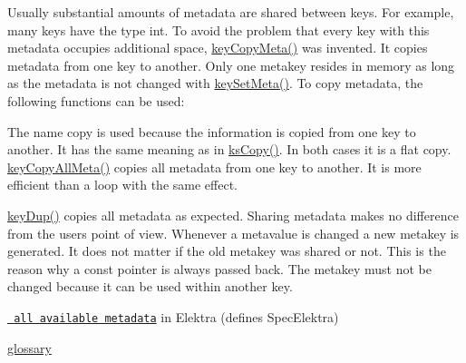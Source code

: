 Usually substantial amounts of metadata are shared between keys. For example, many keys have the type {\ttfamily int}. To avoid the problem that every key with this metadata occupies additional space, {\ttfamily \mbox{\hyperlink{group__keymeta_ga9a22b992478e613c8788bd460b4a1f0c}{key\+Copy\+Meta()}}} was invented. It copies metadata from one key to another. Only one metakey resides in memory as long as the metadata is not changed with {\ttfamily \mbox{\hyperlink{group__keymeta_gae1f15546b234ffb6007d8a31178652b9}{key\+Set\+Meta()}}}. To copy metadata, the following functions can be used\+:


\begin{DoxyCode}{0}
\end{DoxyCode}


The name {\ttfamily copy} is used because the information is copied from one key to another. It has the same meaning as in {\ttfamily \mbox{\hyperlink{group__keyset_gaba1f1dbea191f4d7e7eb3e4296ae7d5e}{ks\+Copy()}}}. In both cases it is a flat copy. {\ttfamily \mbox{\hyperlink{group__keymeta_ga8e63720a65610a29597494d0671f9401}{key\+Copy\+All\+Meta()}}} copies all metadata from one key to another. It is more efficient than a loop with the same effect.

{\ttfamily \mbox{\hyperlink{group__key_gae6ec6a60cc4b8c1463fa08623d056ce3}{key\+Dup()}}} copies all metadata as expected. Sharing metadata makes no difference from the user\textquotesingle{}s point of view. Whenever a metavalue is changed a new metakey is generated. It does not matter if the old metakey was shared or not. This is the reason why a const pointer is always passed back. The metakey must not be changed because it can be used within another key.


\begin{DoxyItemize}
\item \href{/home/mpranj/workspace/libelektra/doc/METADATA.ini}{\texttt{ all available metadata}} in Elektra (defines Spec\+Elektra)
\item \mbox{\hyperlink{doc_help_elektra-glossary_md}{glossary}} 
\end{DoxyItemize}